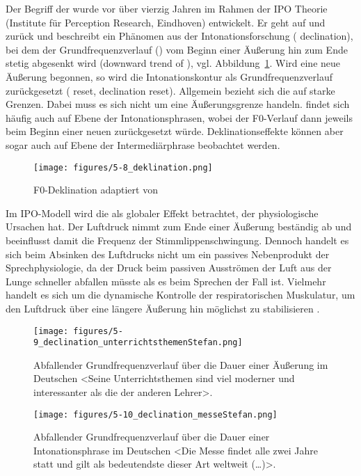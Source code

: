 Der Begriff der  wurde vor über vierzig Jahren im Rahmen der IPO Theorie (Institute für Perception Research, Eindhoven) entwickelt. Er geht auf \citet{Cohen1967} und \citet{tHart1990} zurück und beschreibt ein Phänomen aus der Intonationsforschung ( declination), bei dem der Grundfrequenzverlauf () vom Beginn einer Äußerung hin zum Ende stetig abgesenkt wird (downward trend of ), vgl. Abbildung~\ref{figure:0508}. Wird eine neue Äußerung begonnen, so wird die Intonationskontur als Grundfrequenzverlauf zurückgesetzt ( reset, declination reset). Allgemein bezieht sich die  auf  starke Grenzen. Dabei muss es sich nicht um eine Äußerungsgrenze handeln.  findet sich häufig auch auf Ebene der Intonationsphrasen, wobei der F0-Verlauf dann jeweils beim Beginn einer neuen  zurückgesetzt würde. Deklinationseffekte können aber sogar auch auf Ebene der Intermediärphrase beobachtet werden.

\begin{figure}
	\texttt{[image: figures/5-8\_deklination.png]}
	\caption{F0-Deklination adaptiert von \citet[][76]{Ladd2008}}
	\label{figure:0508}
\end{figure}

Im IPO-Modell wird die  als globaler Effekt betrachtet, der physiologische Ursachen hat. Der Luftdruck nimmt zum Ende einer Äußerung beständig ab und beeinflusst damit die Frequenz der Stimmlippenschwingung. Dennoch handelt es sich beim Absinken des Luftdrucks nicht um ein passives Nebenprodukt der Sprechphysiologie, da der Druck beim passiven Ausströmen der Luft aus der Lunge schneller abfallen müsste als es beim Sprechen der Fall ist. Vielmehr handelt es sich um die dynamische Kontrolle der respiratorischen Muskulatur, um den Luftdruck über eine längere Äußerung hin möglichst zu stabilisieren \citep[][66]{Gelfer1987}.


\begin{figure}[p]
	\texttt{[image: figures/5-9\_declination\_unterrichtsthemenStefan.png]}
	\caption{Abfallender Grundfrequenzverlauf über die Dauer einer Äußerung im Deutschen <Seine Unterrichtsthemen sind viel moderner und interessanter als die der anderen Lehrer>.}
	\label{figure:0509}
\end{figure}


\begin{figure}[p]
	\texttt{[image: figures/5-10\_declination\_messeStefan.png]}
	\caption{Abfallender Grundfrequenzverlauf über die Dauer einer Intonationsphrase im Deutschen <Die Messe findet alle zwei Jahre statt und gilt als bedeutendste dieser Art weltweit (\dots)>.}
	\label{figure:0510}
\end{figure}



